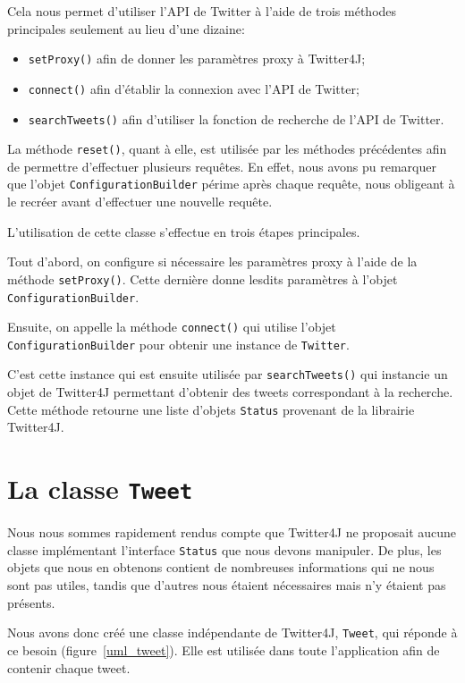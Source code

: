 \documentclass[12pt,a4paper]{report}
\begin{document}
Cela nous permet d'utiliser l'API de Twitter à l'aide de trois méthodes
principales seulement au lieu d'une dizaine:

\begin{itemize}
	\item
		\texttt{setProxy()} afin de donner les paramètres proxy à Twitter4J;
	\item
		\texttt{connect()} afin d'établir la connexion avec l'API de Twitter;
	\item
		\texttt{searchTweets()} afin d'utiliser la fonction de recherche de
		l'API de Twitter.
\end{itemize}

La méthode \texttt{reset()}, quant à elle, est utilisée par les méthodes
précédentes afin de permettre d'effectuer plusieurs requêtes. En effet, nous
avons pu remarquer que l'objet \texttt{ConfigurationBuilder} périme après chaque
requête, nous obligeant à le recréer avant d'effectuer une nouvelle requête.

L'utilisation de cette classe s'effectue en trois étapes principales.

Tout d'abord, on configure si nécessaire les paramètres proxy à l'aide de la
méthode \texttt{setProxy()}. Cette dernière donne lesdits paramètres à l'objet
\texttt{ConfigurationBuilder}.

Ensuite, on appelle la méthode \texttt{connect()} qui utilise l'objet
\texttt{ConfigurationBuilder} pour obtenir une instance de \texttt{Twitter}.

C'est cette instance qui est ensuite utilisée par \texttt{searchTweets()} qui
instancie un objet de Twitter4J permettant d'obtenir des tweets correspondant
à la recherche. Cette méthode retourne une liste d'objets \texttt{Status}
provenant de la librairie Twitter4J.

\newpage
\section{La classe \texttt{Tweet}}

Nous nous sommes rapidement rendus compte que Twitter4J ne proposait aucune
classe implémentant l'interface \texttt{Status} que nous devons manipuler. De
plus, les objets que nous en obtenons contient de nombreuses informations qui ne
nous sont pas utiles, tandis que d'autres nous étaient nécessaires mais
n'y étaient pas présents.

Nous avons donc créé une classe indépendante de Twitter4J, \texttt{Tweet}, qui
réponde à ce besoin (figure~\ref{uml_tweet}). Elle est utilisée dans toute l'application afin de contenir
chaque tweet.
\end{document}
